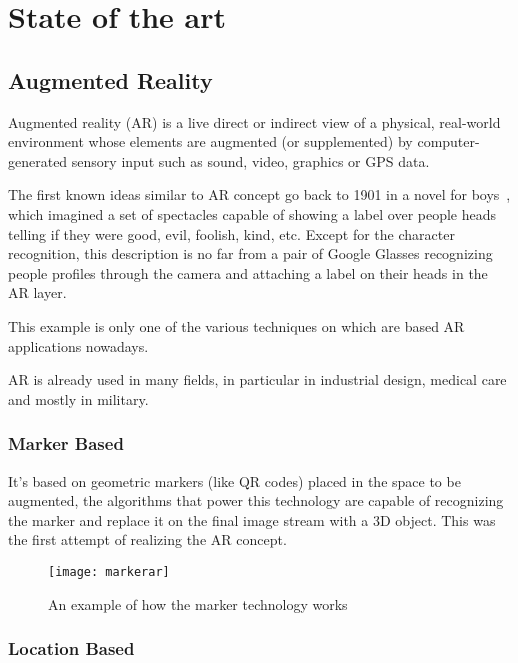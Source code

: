 \chapter{State of the art}

	\section{Augmented Reality}
	
		\begin{quoting}
			Augmented reality (AR) is a live direct or indirect view of a physical, real-world environment whose elements are augmented (or supplemented) by computer-generated sensory input such as sound, video, graphics or GPS data.~\cite{wiki:ar}
		\end{quoting}
		
		The first known ideas similar to AR concept go back to 1901 in a novel for boys~\cite{baum:master}, which imagined a set of spectacles capable of showing a label over people heads telling if they were good, evil, foolish, kind, etc.
		Except for the character recognition, this description is no far from a pair of Google Glasses recognizing people profiles through the camera and attaching a label on their heads in the AR layer.
		
		This example is only one of the various techniques on which are based AR applications nowadays.
		
		AR is already used in many fields, in particular in industrial design, medical care and mostly in military.
		
		\subsection{Marker Based}
			
			It's based on geometric markers (like QR codes) placed in the space to be augmented, the algorithms that power this technology are capable of recognizing the marker and replace it on the final image stream with a 3D object.
			This was the first attempt of realizing the AR concept.
			
			\begin{figure}
				\centering
				\texttt{[image: markerar]}
				\caption{An example of how the marker technology works}
			\end{figure}
		
		\subsection{Location Based}
		
